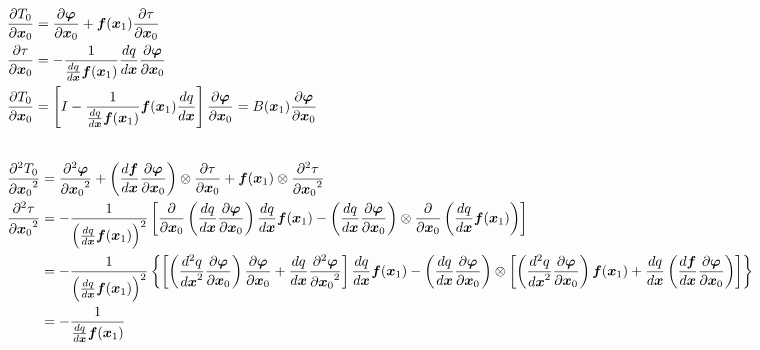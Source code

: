 \documentclass[a4paper]{article}
\newcommand{\deriv}[3][1]{%
    \ifthenelse{\equal{#1}{1}}{\frac{d #2}{d #3}}{\frac{d^#1 #2}{{d #3}^#1}}
}
\newcommand{\pderiv}[3][1]{%
    \ifthenelse{\equal{#1}{1}}{\frac{\partial #2}{\partial #3}}{\frac{\partial^#1 #2}{{\partial #3}^#1}}
}
\newcommand{\parens}[1]{\left(#1\right)}
\newcommand{\braces}[1]{\left\{#1\right\}}
\newcommand{\brackets}[1]{\left[#1\right]}
\newcommand{\traj}{\bm \varphi}
\begin{document}
\clearpage
\begin{align}
    &\begin{aligned}
        \pderiv{T_0}{\bm x_0}
        &= \pderiv{\traj}{\bm x_0}
        + \bm f(\bm x_1) \pderiv{\tau}{\bm x_0}
        \\
        \pderiv{\tau}{\bm x_0}
        &=
        - \frac{1}{\deriv{q}{\bm x} \bm f(\bm x_1)} \deriv{q}{\bm x} \pderiv{\traj}{\bm x_0}
        \\
        \pderiv{T_0}{\bm x_0}
        &=
        \brackets{
            I - \frac{1}{\deriv{q}{\bm x} \bm f(\bm x_1)} \bm f(\bm x_1) \deriv{q}{\bm x}
        } \pderiv{\traj}{\bm x_0}
        = B(\bm x_1) \pderiv{\traj}{\bm x_0}
    \end{aligned}
    \\[20pt]
    &\begin{aligned}
        \pderiv[2]{T_0}{\bm x_0} &=
        \pderiv[2]{\traj}{\bm x_0}
        +
        \parens{
            \deriv{\bm f}{\bm x}
            \pderiv{\traj}{\bm x_0}
        } \otimes
        \pderiv{\tau}{\bm x_0}
        +
        \bm f(\bm x_1) \otimes
        \pderiv[2]{\tau}{\bm x_0}
        \\
        \pderiv[2]{\tau}{\bm x_0} &=
        - \frac{1}{
            \parens{\deriv{q}{\bm x}\bm f(\bm x_1)}^2
        }
        \brackets{
            \pderiv{}{\bm x_0}\parens{\deriv{q}{\bm x}\pderiv{\traj}{\bm x_0}}
            \deriv{q}{\bm x} \bm f(\bm x_1)
            -
            \parens{\deriv{q}{\bm x}\pderiv{\traj}{\bm x_0}} \otimes
            \pderiv{}{\bm x_0}\parens{
                \deriv{q}{\bm x} \bm f(\bm x_1)
            }
        }
        \\
        &=
        - \frac{1}{
            \parens{\deriv{q}{\bm x}\bm f(\bm x_1)}^2
        }
        \braces{
            \brackets{
            \parens{\deriv[2]{q}{\bm x}\pderiv{\traj}{\bm x_0}}
            \pderiv{\traj}{\bm x_0}
            +
            \deriv{q}{\bm x}\pderiv[2]{\traj}{\bm x_0}
            }
            \deriv{q}{\bm x} \bm f(\bm x_1)
            -
            \parens{\deriv{q}{\bm x}\pderiv{\traj}{\bm x_0}}\otimes
            \brackets{
                \parens{
                    \deriv[2]{q}{\bm x}\pderiv{\traj}{\bm x_0}
                }
                \bm f(\bm x_1)
                +
                \deriv{q}{\bm x}
                \parens{\deriv{\bm f}{\bm x} \pderiv{\traj}{\bm x_0}}
            }
        }
        \\
        &=
        - \frac{1}{
            {\deriv{q}{\bm x}\bm f(\bm x_1)}
}
\end{aligned}
\end{align}
\end{document}

